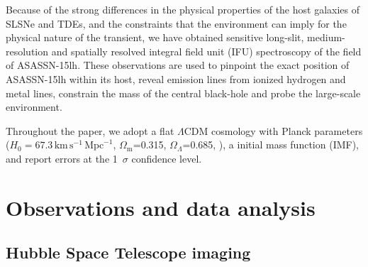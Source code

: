 \documentclass[traditabstract]{aa}
\begin{document}
Because of the strong differences in the physical properties of the host galaxies of SLSNe and TDEs, and the constraints that the environment can imply for the physical nature of the transient, we have obtained sensitive long-slit, medium-resolution and spatially resolved integral field unit (IFU) spectroscopy of the field of ASASSN-15lh. These observations are used to pinpoint the exact position of ASASSN-15lh within its host, reveal emission lines from ionized hydrogen and metal lines, constrain the mass of the central black-hole and probe the large-scale environment.

Throughout the paper, we adopt a flat $\Lambda$CDM cosmology with Planck parameters ($H_0=67.3\,\mathrm{km}\,\mathrm{s}^{-1}\,\mathrm{Mpc}^{-1}$, $\Omega_\mathrm{m}$=0.315, $\Omega_\Lambda$=0.685, \citealt{2014A&A...571A..16P}), a \citet{2003PASP..115..763C} initial mass function (IMF), and report errors at the 1~$\sigma$ confidence level.

\section{Observations and data analysis}
\label{sec:Obs}

\subsection{Hubble Space Telescope imaging}
\label{obs:hst}
\end{document}
